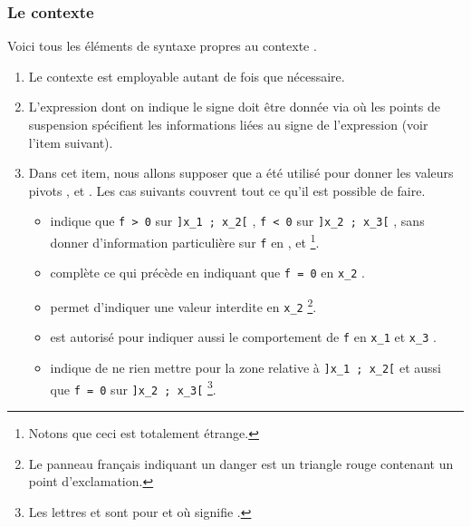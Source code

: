 \documentclass[10pt, a4paper]{article}
\begin{document}

\subsubsection{Le contexte }

Voici tous les éléments de syntaxe propres au contexte .
\begin{enumerate}
    \item Le contexte  est employable autant de fois que nécessaire.


	\item L'expression dont on indique le signe doit être donnée via  où les points de suspension spécifient les informations liées au signe de l'expression (voir l'item suivant). 


    \item Dans cet item, nous allons supposer que  a été utilisé pour donner les valeurs pivots  ,  et  . Les cas suivants couvrent tout ce qu'il est possible de faire.
    \begin{itemize}
        \item {} indique que
        \verb#f > 0# sur \verb#]x_1 ; x_2[# ,
        \verb#f < 0# sur \verb#]x_2 ; x_3[# ,
        sans donner d'information particulière sur
        \verb#f# en  ,  et  
        \footnote{
        	Notons que ceci est totalement étrange.
		}.


        \item {} complète ce qui précède en indiquant que \verb#f = 0# en \verb#x_2# .


        \item {} permet d'indiquer une valeur interdite en \verb#x_2#
        \footnote{
        	Le panneau français indiquant un danger est un triangle rouge contenant un point d'exclamation.
		}.


        \item {} est autorisé pour indiquer aussi le comportement de \verb#f# en \verb#x_1# et \verb#x_3# .


        \item {}  indique de ne rien mettre pour la zone relative à \verb#]x_1 ; x_2[# et aussi que \verb#f = 0# sur \verb#]x_2 ; x_3[#
        \footnote{
        	Les lettres  et  sont pour
        	 et 
        	où
        	 signifie .
		}.
    \end{itemize}
\end{enumerate}
\end{document}
